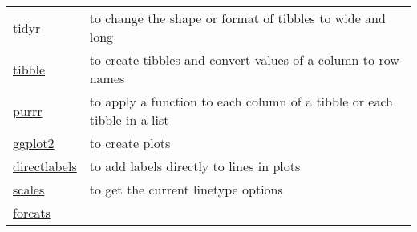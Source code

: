 \documentclass[
]{article}
\begin{document}
\begin{longtable}[]{@{}ll@{}}
\begin{minipage}[t]{0.41\columnwidth}
\href{https://tidyr.tidyverse.org/}{tidyr}\strut
\end{minipage} & \begin{minipage}[t]{0.53\columnwidth}\raggedright
to change the shape or format of tibbles to wide and long\strut
\end{minipage}\tabularnewline
\begin{minipage}[t]{0.41\columnwidth}\raggedright
\href{https://tibble.tidyverse.org/}{tibble}\strut
\end{minipage} & \begin{minipage}[t]{0.53\columnwidth}\raggedright
to create tibbles and convert values of a column to row names\strut
\end{minipage}\tabularnewline
\begin{minipage}[t]{0.41\columnwidth}\raggedright
\href{https://purrr.tidyverse.org/}{purrr}\strut
\end{minipage} & \begin{minipage}[t]{0.53\columnwidth}\raggedright
to apply a function to each column of a tibble or each tibble in a
list\strut
\end{minipage}\tabularnewline
\begin{minipage}[t]{0.41\columnwidth}\raggedright
\href{https://ggplot2.tidyverse.org/}{ggplot2}\strut
\end{minipage} & \begin{minipage}[t]{0.53\columnwidth}\raggedright
to create plots\strut
\end{minipage}\tabularnewline
\begin{minipage}[t]{0.41\columnwidth}\raggedright
\href{http://directlabels.r-forge.r-project.org/docs/index.html}{directlabels}\strut
\end{minipage} & \begin{minipage}[t]{0.53\columnwidth}\raggedright
to add labels directly to lines in plots\strut
\end{minipage}\tabularnewline
\begin{minipage}[t]{0.41\columnwidth}\raggedright
\href{https://cran.r-project.org/web/packages/scales/scales.pdf}{scales}\strut
\end{minipage} & \begin{minipage}[t]{0.53\columnwidth}\raggedright
to get the current linetype options\strut
\end{minipage}\tabularnewline
\begin{minipage}[t]{0.41\columnwidth}\raggedright
\href{https://forcats.tidyverse.org/}{forcats}\strut
\end{minipage} & \begin{minipage}[t]{0.53\columnwidth}\raggedright

\end{minipage}
\end{longtable}
\end{document}
